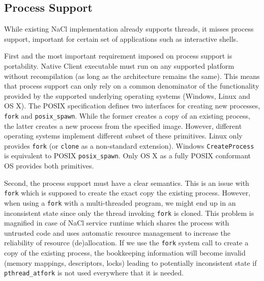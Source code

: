 \subsection{Process Support}
\label{sub:process_support}

While existing NaCl implementation already supports threads, it misses
process support, important for certain set of applications such as
interactive shells.  

First and the most important requirement imposed on process support is
portability. Native Client executable must run on any supported platform
without recompilation (as long as the architecture remains the same).
This means that process support can only rely on a common denominator of
the functionality provided by the supported underlying operating systems
(\ie Windows, Linux and OS X). The POSIX specification defines two
interfaces for creating new processes, \lstinline`fork` and
\lstinline`posix_spawn`. While the former creates a copy of an existing
process, the latter creates a new process from the specified image.
However, different operating systems implement different subset of these
primitives. Linux only provides \lstinline`fork` (or \lstinline`clone`
as a non-standard extension).  Windows \lstinline`CreateProcess` is
equivalent to POSIX \lstinline`posix_spawn`. Only OS X as a fully POSIX
conformant OS provides both primitives.

Second, the process support must have a clear semantics. This is an
issue with \lstinline`fork` which is supposed to create the exact copy
the existing process. However, when using a \lstinline`fork` with a
multi-threaded program, we might end up in an inconsistent state since
only the thread invoking \lstinline`fork` is cloned.  This problem is
magnified in case of NaCl service runtime which shares the process with
untrusted code and uses automatic resource management to increase the
reliability of resource (de)allocation. If we use the \lstinline`fork`
system call to create a copy of the existing process, the bookkeeping
information will become invalid (\eg memory mappings, descriptors,
locks) leading to potentially inconsistent state if
\lstinline`pthread_atfork` is not used everywhere that it is needed.



